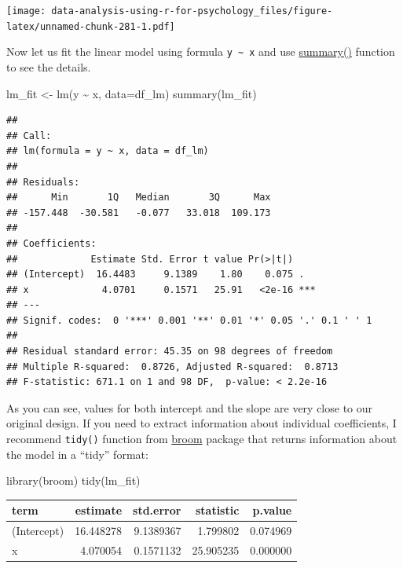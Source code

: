\documentclass[
]{book}
\newenvironment{Shaded}{\begin{snugshade}}{\end{snugshade}}
\newcommand{\AttributeTok}[1]{\textcolor[rgb]{0.77,0.63,0.00}{#1}}
\newcommand{\FunctionTok}[1]{\textcolor[rgb]{0.00,0.00,0.00}{#1}}
\newcommand{\NormalTok}[1]{#1}
\newcommand{\OtherTok}[1]{\textcolor[rgb]{0.56,0.35,0.01}{#1}}
\newcommand{\SpecialCharTok}[1]{\textcolor[rgb]{0.00,0.00,0.00}{#1}}
\begin{document}
\texttt{[image: data-analysis-using-r-for-psychology\_files/figure-latex/unnamed-chunk-281-1.pdf]}

Now let us fit the linear model using formula \texttt{y\ \textasciitilde{}\ x} and use \href{https://stat.ethz.ch/R-manual/R-devel/library/stats/html/summary.lm.html}{summary()} function to see the details.

\begin{Shaded}
\begin{Highlighting}[]
\NormalTok{lm\_fit }\OtherTok{\textless{}{-}} \FunctionTok{lm}\NormalTok{(y }\SpecialCharTok{\textasciitilde{}}\NormalTok{ x, }\AttributeTok{data=}\NormalTok{df\_lm)}
\FunctionTok{summary}\NormalTok{(lm\_fit)}
\end{Highlighting}
\end{Shaded}

\begin{verbatim}
## 
## Call:
## lm(formula = y ~ x, data = df_lm)
## 
## Residuals:
##      Min       1Q   Median       3Q      Max 
## -157.448  -30.581   -0.077   33.018  109.173 
## 
## Coefficients:
##             Estimate Std. Error t value Pr(>|t|)    
## (Intercept)  16.4483     9.1389    1.80    0.075 .  
## x             4.0701     0.1571   25.91   <2e-16 ***
## ---
## Signif. codes:  0 '***' 0.001 '**' 0.01 '*' 0.05 '.' 0.1 ' ' 1
## 
## Residual standard error: 45.35 on 98 degrees of freedom
## Multiple R-squared:  0.8726, Adjusted R-squared:  0.8713 
## F-statistic: 671.1 on 1 and 98 DF,  p-value: < 2.2e-16
\end{verbatim}

As you can see, values for both intercept and the slope are very close to our original design. If you need to extract information about individual coefficients, I recommend \texttt{tidy()} function from \href{https://github.com/tidymodels/broom}{broom} package that returns information about the model in a ``tidy'' format:

\begin{Shaded}
\begin{Highlighting}[]
\FunctionTok{library}\NormalTok{(broom)}
\FunctionTok{tidy}\NormalTok{(lm\_fit)}
\end{Highlighting}
\end{Shaded}

\begin{tabular}{l|r|r|r|r}
\hline
term & estimate & std.error & statistic & p.value\\
\hline
(Intercept) & 16.448278 & 9.1389367 & 1.799802 & 0.074969\\
\hline
x & 4.070054 & 0.1571132 & 25.905235 & 0.000000\\
\hline
\end{tabular}
\end{document}
